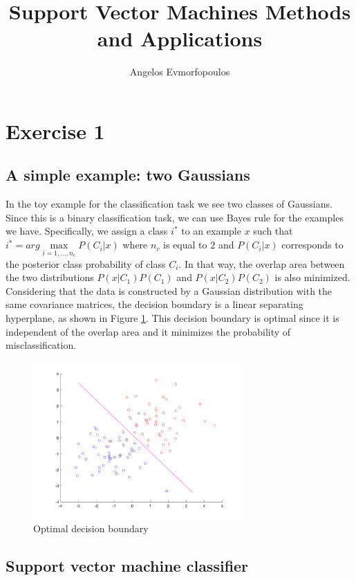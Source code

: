 \documentclass[a4paper, 11pt, one column]{article}
\title{Support Vector Machines Methods and Applications}
\author{Angelos Evmorfopoulos}
\begin{document}
\maketitle


\section{Exercise 1}
\subsection{A simple example: two Gaussians}

In the toy example for the classification task we see two classes of Gaussians. Since this is a binary classification task, we can use Bayes rule for the examples we have. Specifically, we assign a class $i^*$ to an example $x$ such that $i^* = arg \max\limits_{i = 1,\dots, n_c} P(C_i|x)$ where $n_c$ is equal to $2$ and $P(C_i|x)$ corresponds to the posterior class probability of class $C_i$. In that way, the overlap area between the two distributions $P(x|C_1)P(C_1)$ and $P(x|C_2)P(C_2)$ is also minimized. Considering that the data is constructed by a Gaussian distribution with the same covariance matrices, the decision boundary is a linear separating hyperplane, as shown in Figure \ref{fig:gaussians}. This decision boundary is optimal since it is independent of the overlap area and it minimizes the probability of misclassification. 

\begin{figure}[h]
    \centering
    \includegraphics[width=8cm]{images/gaussians.png}
    \caption{Optimal decision boundary}
    \label{fig:gaussians}
\end{figure}

\subsection{Support vector machine classifier}
\end{document}
